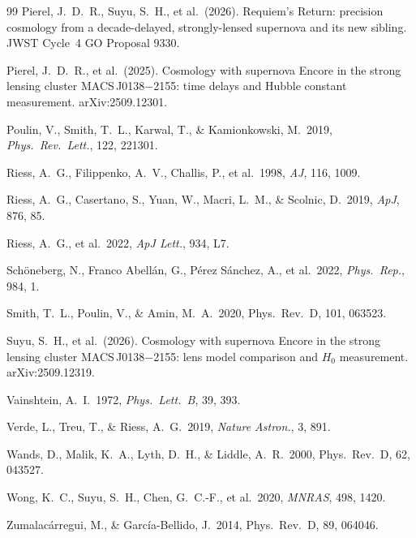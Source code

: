 \documentclass[12pt,a4paper]{article}
\newcommand{\prd}{Phys.\ Rev.\ D}
\begin{document}
\begin{thebibliography}{99}
Pierel, J.~D.~R., Suyu, S.~H., et al.\ (2026).
Requiem's Return: precision cosmology from a decade-delayed,
strongly-lensed supernova and its new sibling.
JWST Cycle~4 GO Proposal 9330.

Pierel, J.~D.~R., et al.\ (2025).
Cosmology with supernova Encore in the strong lensing cluster
MACS\,J0138$-$2155: time delays and Hubble constant measurement.
arXiv:2509.12301.

Poulin, V., Smith, T.~L., Karwal, T., \& Kamionkowski, M.\ 2019,
\textit{Phys.\ Rev.\ Lett.}, 122, 221301.

Riess, A.~G., Filippenko, A.~V., Challis, P., et al.\ 1998, \textit{AJ}, 116, 1009.

Riess, A.~G., Casertano, S., Yuan, W., Macri, L.~M., \& Scolnic, D.\ 2019,
\textit{ApJ}, 876, 85.

Riess, A.~G., et al.\ 2022, \textit{ApJ Lett.}, 934, L7.

Sch\"oneberg, N., Franco Abell\'an, G., P\'erez S\'anchez, A., et al.\ 2022,
\textit{Phys.\ Rep.}, 984, 1.

Smith, T.~L., Poulin, V., \& Amin, M.~A.\ 2020, \prd, 101, 063523.

Suyu, S.~H., et al.\ (2026).
Cosmology with supernova Encore in the strong lensing cluster
MACS\,J0138$-$2155: lens model comparison and $H_0$ measurement.
arXiv:2509.12319.

Vainshtein, A.~I.\ 1972, \textit{Phys.\ Lett.\ B}, 39, 393.

Verde, L., Treu, T., \& Riess, A.~G.\ 2019, \textit{Nature Astron.}, 3, 891.

Wands, D., Malik, K.~A., Lyth, D.~H., \& Liddle, A.~R.\ 2000, \prd, 62, 043527.

Wong, K.~C., Suyu, S.~H., Chen, G.~C.-F., et al.\ 2020,
\textit{MNRAS}, 498, 1420.

Zumalac\'arregui, M., \& Garc\'ia-Bellido, J.\ 2014, \prd, 89, 064046.


\end{thebibliography}
\end{document}
